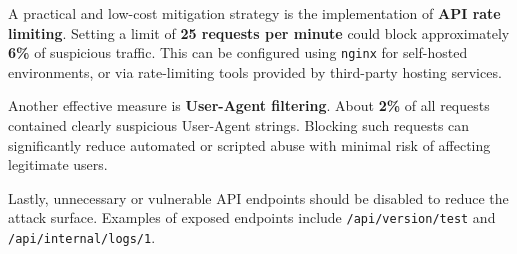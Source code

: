 \documentclass{article}
\theoremstyle{mytheoremstyle}
\theoremstyle{mytheoremstyle}
\theoremstyle{myproblemstyle}
\begin{document}
A practical and low-cost mitigation strategy is the implementation of \textbf{API rate limiting}. Setting a limit of \textbf{25 requests per minute} could block approximately \textbf{6\%} of suspicious traffic. This can be configured using \texttt{nginx} for self-hosted environments, or via rate-limiting tools provided by third-party hosting services.

Another effective measure is \textbf{User-Agent filtering}. About \textbf{2\%} of all requests contained clearly suspicious User-Agent strings. Blocking such requests can significantly reduce automated or scripted abuse with minimal risk of affecting legitimate users.

Lastly, unnecessary or vulnerable API endpoints should be disabled to reduce the attack surface. Examples of exposed endpoints include \texttt{/api/version/test} and \texttt{/api/internal/logs/1}.
\end{document}

